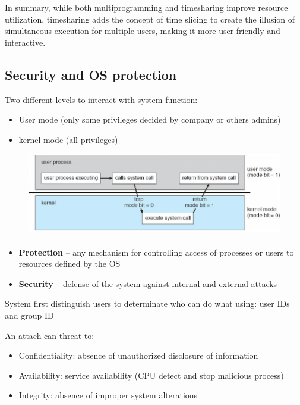 In summary, while both multiprogramming and timesharing improve resource utilization, timesharing adds the concept of time slicing to create the illusion of simultaneous execution for multiple users, making it more user-friendly and interactive.


\newpage
\subsection{Security and OS protection}
Two different levels to interact with system function:

\begin{itemize}
    \item User mode (only some privileges decided by company or others admins)
    \item kernel mode (all privileges)
\end{itemize}

\begin{figure}[htbp]
    \centering
    \includegraphics[width=0.8\linewidth]{img/secur.png}
\end{figure}

\paragraph{}
\begin{itemize}
    \item \textbf{Protection} – any mechanism for controlling access of processes or users to resources defined by the OS
    \item \textbf{Security} – defense of the system against internal and external attacks
\end{itemize}

System first distinguish users to determinate who can do what using: user IDs and group ID


An attach can threat to:
\begin{itemize}
    \item Confidentiality: absence of unauthorized disclosure of information
    \item Availability: service availability (CPU detect and stop malicious process)
    \item Integrity: absence of improper system alterations
\end{itemize}




